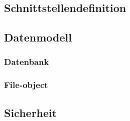 \documentclass[10pt,paper=a4,final]{scrartcl}
\begin{document}
\subsection{Schnittstellendefinition}
\subsection{Datenmodell}
\subsubsection{Datenbank}
\subsubsection{File-object}
\subsection{Sicherheit}
\end{document}
